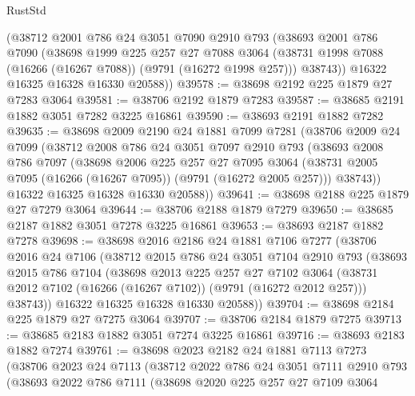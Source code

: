 \begin{lexlean}{RustStd}
\begin{coremodule}
      (@38712
        @2001
        @786
        @24
        @3051
        @7090
        @2910
        @793
        (@38693
          @2001
          @786
          @7090
          (@38698
            @1999
            @225
            @257
            @27
            @7088
            @3064
            (@38731 @1998 @7088 (@16266 (@16267 @7088)) (@9791 (@16272 @1998 @257)))
            @38743))
        @16322
        @16325
        @16328
        @16330
        @20588))
@39578 := @38698 @2192 @225 @1879 @27 @7283 @3064
@39581 := @38706 @2192 @1879 @7283
@39587 := @38685 @2191 @1882 @3051 @7282 @3225 @16861
@39590 := @38693 @2191 @1882 @7282
@39635 := @38698
    @2009
    @2190
    @24
    @1881
    @7099
    @7281
    (@38706
      @2009
      @24
      @7099
      (@38712
        @2008
        @786
        @24
        @3051
        @7097
        @2910
        @793
        (@38693
          @2008
          @786
          @7097
          (@38698
            @2006
            @225
            @257
            @27
            @7095
            @3064
            (@38731 @2005 @7095 (@16266 (@16267 @7095)) (@9791 (@16272 @2005 @257)))
            @38743))
        @16322
        @16325
        @16328
        @16330
        @20588))
@39641 := @38698 @2188 @225 @1879 @27 @7279 @3064
@39644 := @38706 @2188 @1879 @7279
@39650 := @38685 @2187 @1882 @3051 @7278 @3225 @16861
@39653 := @38693 @2187 @1882 @7278
@39698 := @38698
    @2016
    @2186
    @24
    @1881
    @7106
    @7277
    (@38706
      @2016
      @24
      @7106
      (@38712
        @2015
        @786
        @24
        @3051
        @7104
        @2910
        @793
        (@38693
          @2015
          @786
          @7104
          (@38698
            @2013
            @225
            @257
            @27
            @7102
            @3064
            (@38731 @2012 @7102 (@16266 (@16267 @7102)) (@9791 (@16272 @2012 @257)))
            @38743))
        @16322
        @16325
        @16328
        @16330
        @20588))
@39704 := @38698 @2184 @225 @1879 @27 @7275 @3064
@39707 := @38706 @2184 @1879 @7275
@39713 := @38685 @2183 @1882 @3051 @7274 @3225 @16861
@39716 := @38693 @2183 @1882 @7274
@39761 := @38698
    @2023
    @2182
    @24
    @1881
    @7113
    @7273
    (@38706
      @2023
      @24
      @7113
      (@38712
        @2022
        @786
        @24
        @3051
        @7111
        @2910
        @793
        (@38693
          @2022
          @786
          @7111
          (@38698
            @2020
            @225
            @257
            @27
            @7109
            @3064

\end{coremodule}
\end{lexlean}
